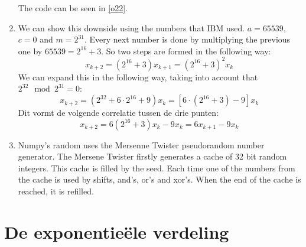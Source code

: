 \documentclass[a4paper,12px]{article}
\begin{document}
\begin{enumerate}
        The code can be seen in \autoref{o22}.
    \item %
        We can show this downside using the numbers that IBM used. $a=65539$,
        $c=0$ and $m=2^{31}$. Every next number is done by multiplying the
        previous one by $65539=2^{16}+3$. So two steps are formed in the
        following way:
        \begin{equation}x_{k+2}=(2^{16}+3) x_{k+1}=(2^{16}+3 )^2 x_{k}\,\end{equation}
        We can expand this in the following way, taking into account that
        $2^{32}\mod2^{31}=0$:
        \begin{equation}x_{k+2}=(2^{32}+6 \cdot2^{16} +9 )x_{k}=[6 \cdot (2^{16}+3)-9]x_{k}\,\end{equation}
        Dit vormt de volgende correlatie tussen de drie punten:
        \begin{equation}x_{k+2}=6(2^{16}+3)x_{k}-9x_{k}=6x_{k+1}-9x_{k}\,\end{equation}
    \item Numpy's random uses the Mersenne Twister pseudorandom number generator.
        The Mersene Twister firstly generates a cache of 32 bit random
        integers. This cache is filled by the seed. Each time one of the
        numbers from the cache is used by shifts, and's, or's and xor's.
        When the end of the cache is reached, it is refilled.
\end{enumerate}
\section{De exponentie\"ele verdeling}
\end{document}
